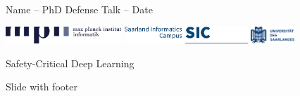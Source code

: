 \documentclass[64pt,aspectratio=169]{beamer}
\begin{document}
\begin{frame}[noframenumbering]
		{\large Name -- PhD Defense Talk -- Date}
		\vskip 0.25cm
		
		\includegraphics[height=0.65cm]{assets/logos/mpilogo-inf-wide}
		\hspace*{0.35cm}
		\includegraphics[height=0.65cm,clip,trim={0 0 6cm 0}]{assets/logos/sic}
		\hspace*{0.35cm}
		\includegraphics[height=0.65cm]{assets/logos/uds}
		
	\end{frame}
	
	
	\addtocounter{framenumber}{-1}
	\begin{frame}{Safety-Critical Deep Learning}		
		\Large 
		\centering
		
		Slide with footer
	\end{frame}
	
\end{document}
